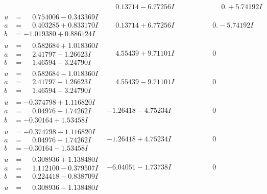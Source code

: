 \documentclass[1p]{elsarticle_modified}
\theoremstyle{definition}
\begin{document}
$$\begin{array}{c|c|c}
 & \phantom{-}0.13714 - 6.77256 I & \phantom{-0.000000 -}0. + 5.74192 I \\ \hline\begin{aligned}
u &= \phantom{-}0.754006 - 0.343369 I \\
a &= \phantom{-}0.403285 + 0.833170 I \\
b &= -1.019380 + 0.886124 I\end{aligned}
 & \phantom{-}0.13714 + 6.77256 I & \phantom{-0.000000 } 0. - 5.74192 I \\ \hline\begin{aligned}
u &= \phantom{-}0.582684 + 1.018360 I \\
a &= \phantom{-}2.41797 - 1.26623 I \\
b &= \phantom{-}1.46594 - 3.24790 I\end{aligned}
 & \phantom{-}4.55439 + 9.71101 I & \phantom{-0.000000 } 0 \\ \hline\begin{aligned}
u &= \phantom{-}0.582684 - 1.018360 I \\
a &= \phantom{-}2.41797 + 1.26623 I \\
b &= \phantom{-}1.46594 + 3.24790 I\end{aligned}
 & \phantom{-}4.55439 - 9.71101 I & \phantom{-0.000000 } 0 \\ \hline\begin{aligned}
u &= -0.374798 + 1.116820 I \\
a &= \phantom{-}0.04976 + 1.74262 I \\
b &= -0.30164 + 1.53458 I\end{aligned}
 & -1.26418 - 4.75234 I & \phantom{-0.000000 } 0 \\ \hline\begin{aligned}
u &= -0.374798 - 1.116820 I \\
a &= \phantom{-}0.04976 - 1.74262 I \\
b &= -0.30164 - 1.53458 I\end{aligned}
 & -1.26418 + 4.75234 I & \phantom{-0.000000 } 0 \\ \hline\begin{aligned}
u &= \phantom{-}0.308936 + 1.138480 I \\
a &= \phantom{-}1.112100 - 0.379507 I \\
b &= \phantom{-}0.224418 - 0.838709 I\end{aligned}
 & -6.04051 - 1.73738 I & \phantom{-0.000000 } 0 \\ \hline\begin{aligned}
u &= \phantom{-}0.308936 - 1.138480 I \\

\end{aligned}
\end{array}$$
\end{document}
